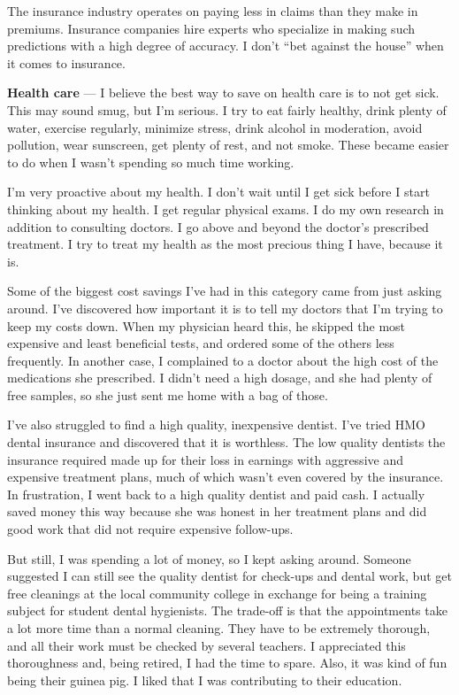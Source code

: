 The insurance industry operates on paying less in claims than they make in premiums. Insurance companies hire experts who specialize in making such predictions with a high degree of accuracy. I don't ``bet against the house'' when it comes to insurance.

\textbf{Health care} --- I believe the best way to save on health care is to not get sick. This may sound smug, but I'm serious. I try to eat fairly healthy, drink plenty of water, exercise regularly, minimize stress, drink alcohol in moderation, avoid pollution, wear sunscreen, get plenty of rest, and not smoke. These became easier to do when I wasn't spending so much time working.

I'm very proactive about my health. I don't wait until I get sick before I start thinking about my health. I get regular physical exams. I do my own research in addition to consulting doctors. I go above and beyond the doctor's prescribed treatment. I try to treat my health as the most precious thing I have, because it is.

Some of the biggest cost savings I've had in this category came from just asking around. I've discovered how important it is to tell my doctors that I'm trying to keep my costs down. When my physician heard this, he skipped the most expensive and least beneficial tests, and ordered some of the others less frequently. In another case, I complained to a doctor about the high cost of the medications she prescribed. I didn't need a high dosage, and she had plenty of free samples, so she just sent me home with a bag of those.

I've also struggled to find a high quality, inexpensive dentist. I've tried HMO dental insurance and discovered that it is worthless. The low quality dentists the insurance required made up for their loss in earnings with aggressive and expensive treatment plans, much of which wasn't even covered by the insurance. In frustration, I went back to a high quality dentist and paid cash. I actually saved money this way because she was honest in her treatment plans and did good work that did not require expensive follow-ups. 

But still, I was spending a lot of money, so I kept asking around. Someone suggested I can still see the quality dentist for check-ups and dental work, but get free cleanings at the local community college in exchange for being a training subject for student dental hygienists. The trade-off is that the appointments take a lot more time than a normal cleaning. They have to be extremely thorough, and all their work must be checked by several teachers. I appreciated this thoroughness and, being retired, I had the time to spare. Also, it was kind of fun being their guinea pig. I liked that I was contributing to their education.


